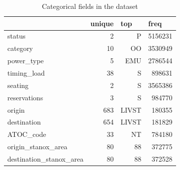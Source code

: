 \documentclass[12pt,a4paper]{article}
\begin{document}
\begin{table}[]
\centering
\caption{Categorical fields in the dataset}
\label{table:etl_categorical}
\begin{tabular}{|l|r|r|r|}
\hline
                          & \multicolumn{1}{l|}{unique} & \multicolumn{1}{l|}{top} & \multicolumn{1}{l|}{freq} \\ \hline
status                    & 2                           & P                        & 5156231                   \\ \hline
category                  & 10                          & OO                       & 3530949                   \\ \hline
power\_type               & 5                           & EMU                      & 2786544                   \\ \hline
timing\_load              & 38                          & S                        & 898631                    \\ \hline
seating                   & 2                           & S                        & 3565386                   \\ \hline
reservations              & 3                           & S                        & 984770                    \\ \hline
origin                    & 683                         & LIVST                    & 180355                    \\ \hline
destination               & 654                         & LIVST                    & 181829                    \\ \hline
ATOC\_code                & 33                          & NT                       & 784180                    \\ \hline
origin\_stanox\_area      & 80                          & 88                       & 372775                    \\ \hline
destination\_stanox\_area & 80                          & 88                       & 372528                    \\ \hline
\end{tabular}
\end{table}
\end{document}
